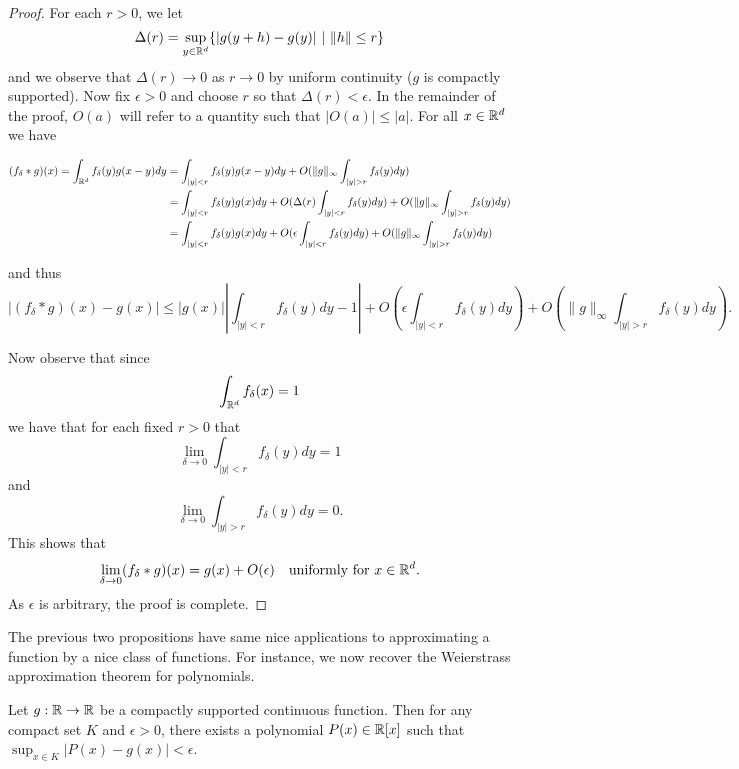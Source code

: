 \documentclass[twoside, a4paper, 10pt]{amsart}
\begin{document}
\begin{proof} For each $r>0$, we let $$\Delta(r) = \sup_{y \in \mathbb{R}^d} \{ |g(y+h) - g(y)| ~|~ \|h\| \leq r \}$$ and we observe that $\Delta(r) \to 0$ as $r \to 0$ by uniform continuity ($g$ is compactly supported). Now fix $\epsilon>0$ and choose $r$ so that $\Delta(r) < \epsilon$. In the remainder of the proof, $O(a)$ will refer to a quantity such that $|O(a)| \leq |a|$. For all $x \in \mathbb{R}^d$ we have

\begin{align*} (f_{\delta} *g)(x) = \int_{\bR^d} f_{\delta} (y) g(x-y) dy &= \int_{|y| < r} f_{\delta}(y) g(x-y) dy + O(\| g \|_{\infty} \int_{|y|>r} f_{\delta}(y) dy) \\ &= \int_{|y| < r} f_{\delta}(y) g(x) dy + O(\Delta(r) \int_{|y| < r} f_{\delta}(y) dy )  + O(\| g \|_{\infty} \int_{|y|>r} f_{\delta}(y) dy) \\
&= \int_{|y| < r} f_{\delta}(y) g(x) dy + O(\epsilon \int_{|y| < r} f_{\delta}(y) dy )  + O(\| g \|_{\infty} \int_{|y|>r} f_{\delta}(y) dy)
 \end{align*} 

and thus $$|(f_{\delta} *g)(x) - g(x)| \leq |g(x)|\left|\int_{|y| < r} f_{\delta}(y) dy - 1\right| +  O(\epsilon \int_{|y| < r} f_{\delta}(y) dy )  + O(\| g \|_{\infty} \int_{|y|>r} f_{\delta}(y) dy). $$

Now observe that since $$\int_{\mathbb{R}^d} f_{\delta}(x) = 1$$ we have that for each fixed $r>0$ that $$\lim_{\delta \to 0} \int_{|y|<r} f_{\delta}(y) dy  = 1$$ and $$\lim_{\delta \to 0 } \int_{|y|>r} f_{\delta}(y) dy  = 0.$$ This shows that  $$\lim_{\delta \to 0} (f_{\delta}*g)(x) = g(x) + O(\epsilon) \quad \text{uniformly for } x \in \mathbb{R}^d.$$ As $\epsilon$ is arbitrary, the proof is complete. \end{proof}

The previous two propositions have same nice applications to approximating a function by a nice class of functions. For instance, we now recover the Weierstrass approximation theorem for polynomials.

\begin{thm} Let $g:\mathbb{R} \to \mathbb{R}$ be a compactly supported continuous function. Then for any compact set $K$ and $\epsilon >0$, there exists a polynomial $P(x) \in \mathbb{R}[x]$ such that $\sup_{x \in K} |P(x) - g(x)| < \epsilon$.

\end{thm}
\end{document}
